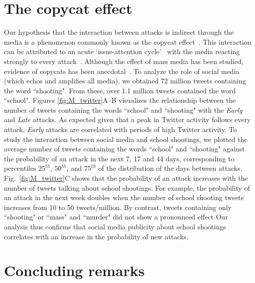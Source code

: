 \section*{The copycat effect}

Our hypothesis that the interaction between attacks is indirect
through the media is a phenomenon commonly known as the copycat
effect~\cite{Coleman2004}. 
This interaction can be attributed to an acute `issue-attention
cycle'~\cite{downs1972up} with the media reacting strongly to every
attack~\cite{Rocque2012}. 
Although the effect of mass media has been studied, evidence of
copycats has been anecdotal~\cite{O2000}. 
To analyze the role of social media (which echos and amplifies all
media), we obtained 72 million tweets containing the word ``shooting". 
From these, over 1.1 million tweets contained the word ``school". 
Figures \ref{fig:M_twitter}A--B visualizes the relationship between
the number of tweets containing the words ``school" and ``shooting"
with the \textit{Early} and \textit{Late} attacks. 
As expected given that a peak in Twitter activity follows every
attack, \textit{Early} attacks are correlated with periods of high
Twitter activity. 
To study the interaction between social media and school shootings, we
plotted the average number of tweets containing the words ``school"
and ``shooting" against the probability of an attack in the next 7, 17
and 44 days, corresponding to percentiles $25^{th}$, $50^{th}$, and
$75^{th}$ of the distribution of the days between attacks. 
Fig.~\ref{fig:M_twitter}C shows that the probability of an attack
increases with the number of tweets talking about school shootings. 
For example, the probability of an attack in the next week doubles
when the number of school shooting tweets increases from 10 to 50
tweets/million.
By contrast, tweets containing only ``shooting" or ``mass" and
``murder" did not show a pronounced effect
Our analysis thus confirms that social media publicity about school
shootings correlates with an increase in the probability of new
attacks.

\section*{Concluding remarks}

